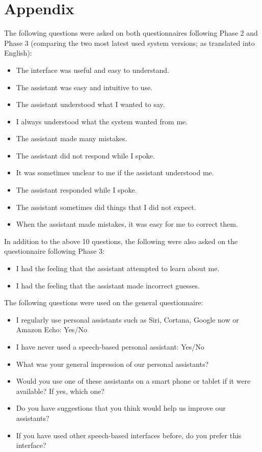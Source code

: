 \documentclass[11pt]{article}
\begin{document}
\section*{Appendix}


\noindent
The following questions were asked on both questionnaires following Phase 2 and Phase 3 (comparing the two most latest used system versions; as translated into English):
{\small
\begin{itemize}
 \item The interface was useful and easy to understand.
 \item The assistant was easy and intuitive to use.
 \item The assistant understood what I wanted to say.
 \item I always understood what the system wanted from me. 
 \item The assistant made many mistakes. 
 \item The assistant did not respond while I spoke.
 \item It was sometimes unclear to me if the assistant understood me. 
 \item The assistant responded while I spoke. 
 \item The assistant sometimes did things that I did not expect.
 \item When the assistant made mistakes, it was easy for me to correct them. 
\end{itemize}
}

\noindent
In addition to the above 10 questions, the following were also asked on the questionnaire following Phase 3:
{\small
\begin{itemize}
 \item I had the feeling that the assistant attempted to learn about me.
 \item I had the feeling that the assistant made incorrect guesses. 
\end{itemize}
}

\noindent
The following questions were used on the general questionnaire:
{\small
\begin{itemize}
 \item I regularly use personal assistants such as Siri, Cortana, Google now or Amazon Echo: Yes/No
 \item I have never used a speech-based personal assistant: Yes/No
 \item What was your general impression of our personal assistants?
 \item Would you use one of these assistants on a smart phone or tablet if it were available? If yes, which one?
 \item Do you have suggestions that you think would help us improve our assistants?
 \item If you have used other speech-based interfaces before, do you prefer this interface?
\end{itemize}
}




\end{document}
